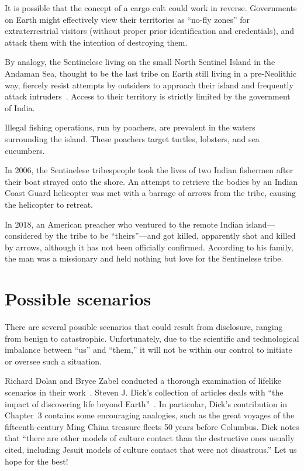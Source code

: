 It is possible that the concept of a cargo cult could work in reverse. Governments on Earth might effectively view their territories as
``no-fly zones''
for extraterrestrial visitors (without proper prior identification and credentials),
and attack them with the intention of destroying them.

By analogy, the Sentinelese living on the small North Sentinel Island in the Andaman Sea, thought to be the last tribe on Earth still living in a pre-Neolithic way,
fiercely resist attempts by outsiders to approach their island and frequently attack intruders~\cite{SentinelIsland2018Nov}.
Access to their territory is strictly limited by the government of India.

Illegal fishing operations, run by poachers, are prevalent in the waters surrounding the island. These poachers target turtles, lobsters, and sea cucumbers.

In 2006, the Sentinelese tribespeople took the lives of two Indian fishermen after their boat strayed onto the shore.
An attempt to retrieve the bodies by an Indian Coast Guard helicopter was met with a barrage of arrows from the tribe, causing the helicopter to retreat.

In 2018, an American preacher who ventured to the remote Indian island---considered by the tribe to be
``theirs''---and got killed, apparently shot and killed by arrows,
although it has not been officially confirmed.
According to his family, the man was a missionary and held nothing but love for the Sentinelese tribe.

\section{Possible scenarios}

There are several possible scenarios that could result from disclosure, ranging from benign to catastrophic. Unfortunately, due to the scientific and technological imbalance between ``us'' and ``them,'' it will not be within our control to initiate or oversee such a situation.

Richard Dolan and Bryce Zabel conducted a thorough examination of lifelike scenarios in their work~\cite{DolanZabel2012May}. Steven J. Dick's collection of articles deals with ``the impact of discovering life beyond Earth''~\cite{Dick2015}. In particular, Dick's contribution in Chapter~3 contains some encouraging analogies, such as the great voyages of the fifteenth-century Ming China treasure fleets 50 years before Columbus. Dick notes that ``there are other models of culture contact than the destructive ones usually cited, including Jesuit models of culture contact that were not disastrous.'' Let us hope for the best!
